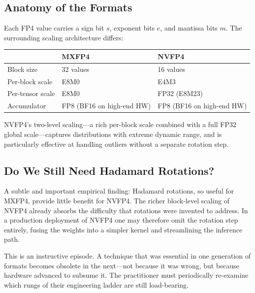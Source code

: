 \documentclass[11pt,a4paper]{article}
\theoremstyle{definition}
\theoremstyle{remark}
\theoremstyle{plain}
\begin{document}
\subsection{Anatomy of the Formats}

Each FP4 value carries a sign bit $s$, exponent bits $e$, and mantissa
bits $m$. The surrounding scaling architecture differs:

\begin{center}
\renewcommand{\arraystretch}{1.25}
\begin{tabular}{@{}lll@{}}
\toprule
& \textbf{MXFP4} & \textbf{NVFP4} \\
\midrule
Block size           & 32 values                      & 16 values \\
Per-block scale      & E8M0                           & E4M3 \\
Per-tensor scale     & E8M0                           & FP32 (E8M23) \\
Accumulator          & FP8 (BF16 on high-end HW)      & FP8 (BF16 on high-end HW) \\
\bottomrule
\end{tabular}
\end{center}

NVFP4's two-level scaling---a rich per-block scale combined with a full
FP32 global scale---captures distributions with extreme dynamic range, and
is particularly effective at handling outliers without a separate rotation
step.

\subsection{Do We Still Need Hadamard Rotations?}

A subtle and important empirical finding: Hadamard rotations, so useful
for MXFP4, provide little benefit for NVFP4. The richer block-level
scaling of NVFP4 already absorbs the difficulty that rotations were
invented to address. In a production deployment of NVFP4 one may therefore
omit the rotation step entirely, fusing the weights into a simpler kernel
and streamlining the inference path.

This is an instructive episode. A technique that was essential in one
generation of formats becomes obsolete in the next---not because it was
wrong, but because hardware advanced to subsume it. The practitioner must
periodically re-examine which rungs of their engineering ladder are still
load-bearing.

\end{document}
